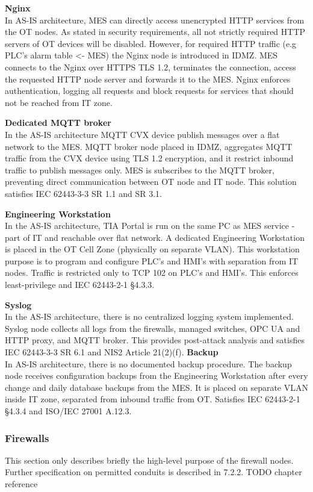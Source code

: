 \documentclass[11pt,a4paper]{article}
\begin{document}
\textbf{Nginx} \\ In AS-IS architecture, MES can directly access unencrypted
HTTP services from the OT nodes. As stated in security requirements, all not
strictly required HTTP servers of OT devices will be disabled. However, for
required HTTP traffic (e.g PLC's alarm table <- MES) the Nginx node is
introduced in IDMZ. MES connects to the Nginx over HTTPS TLS 1.2, terminates
the connection, access the requested HTTP node server and forwards it to the
MES. Nginx enforces authentication, logging all requests and block requests for
services that should not be reached from IT zone.

\textbf{Dedicated MQTT broker} \\ In the AS-IS architecture MQTT CVX device
publish messages over a flat network to the MES. MQTT broker node placed in
IDMZ, aggregates MQTT traffic from the CVX device using TLS 1.2 encryption, and
it restrict inbound traffic to publish messages only. MES is subscribes to the
MQTT broker, preventing direct communication between OT node and IT node. This
solution satisfies IEC 62443-3-3 SR 1.1 and SR 3.1.

\textbf{Engineering Workstation} \\ In the AS-IS architecture, TIA Portal is
run on the same PC as MES service - part of IT and reachable over flat network.
A dedicated Engineering Workstation is placed in the OT Cell Zone (physically
on separate VLAN). This workstation purpose is to program and configure PLC's
and HMI's with separation from IT nodes. Traffic is restricted only to TCP 102
on PLC's and HMI's. This enforces least-privilege and IEC 62443-2-1 §4.3.3.

\textbf{Syslog} \\ In the AS-IS architecture, there is no centralized logging
system implemented. Syslog node collects all logs from the firewalls, managed
switches, OPC UA and HTTP proxy, and MQTT broker. This provides post-attack
analysis and satisfies IEC 62443-3-3 SR 6.1 and NIS2 Article 21(2)(f).
\textbf{Backup} \\ In AS-IS architecture, there is no documented backup
procedure. The backup node receives configuration backups from the Engineering
Workstation after every change and daily database backups from the MES. It is
placed on separate VLAN inside IT zone, separated from inbound traffic from
OT. Satisfies IEC 62443-2-1 §4.3.4 and ISO/IEC 27001 A.12.3.

\subsubsection{Firewalls} 
This section only describes briefly the high-level
purpose of the firewall nodes. Further specification on permitted conduits is
described in 7.2.2. TODO chapter reference
\end{document}
